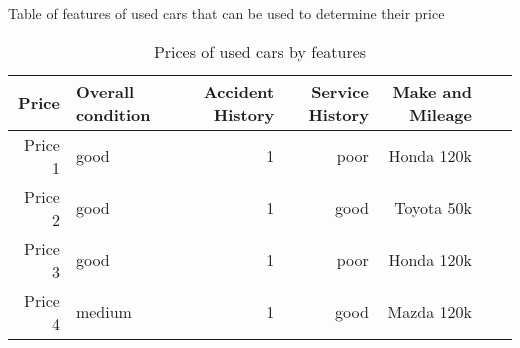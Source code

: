 \documentclass[12pt]{book}
\begin{document}
\vskip 20pt



Table of features of used cars that can be used to determine their price







\begin{table}[ht]



\centering



\begin{tabular}{rlrrrrr}



\hline



Price&Overall condition&Accident History&Service History& Make and Mileage\\



\hline



Price 1 &good&1&poor&Honda 120k\\



Price 2 &good&1&good&Toyota 50k \\



Price 3 &good&1&poor&Honda 120k \\



Price 4 &medium&1&good&Mazda 120k \\



\hline



\end{tabular}



\caption{Prices of used cars by features}



\label{tab:summary}



\end{table}







\vskip 12pt
\end{document}
